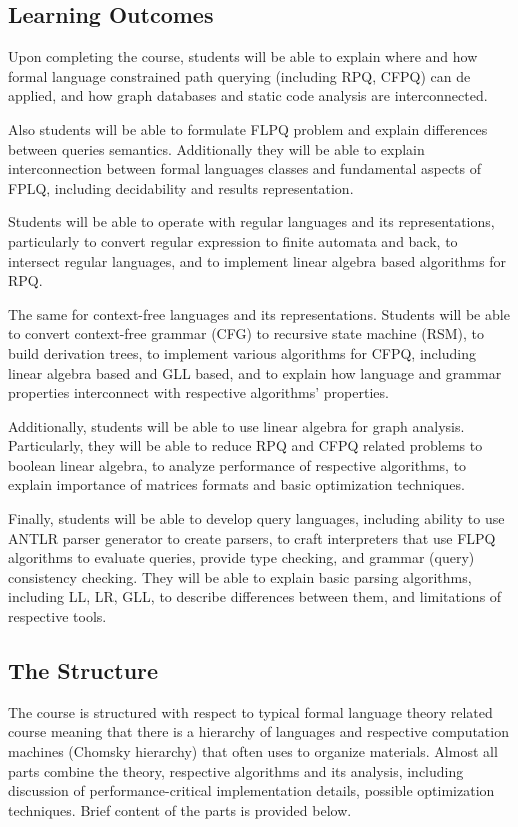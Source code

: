\documentclass[sigconf]{acmart}
\begin{document}
\subsection{Learning Outcomes}

Upon completing the course, students will be able to explain where and how formal language constrained path querying (including RPQ, CFPQ) can de applied, and how graph databases and static code analysis are interconnected.

Also students will be able to formulate FLPQ problem and explain differences between queries semantics.
Additionally they will be able to explain interconnection between formal languages classes and fundamental aspects of FPLQ, including decidability and results representation.

Students will be able to operate with regular languages and its representations, particularly to convert regular expression to finite automata and back, to intersect regular languages, and to implement linear algebra based algorithms for RPQ. 

The same for context-free languages and its representations. 
Students will be able to convert context-free grammar (CFG) to recursive state machine (RSM), to build derivation trees, to implement various algorithms for CFPQ, including linear algebra based and GLL based, and to explain how language and grammar properties interconnect with respective algorithms' properties. 

Additionally, students will be able to use linear algebra for graph analysis. 
Particularly, they will be able to reduce RPQ and CFPQ related problems to boolean linear algebra, to analyze performance of respective algorithms, to explain importance of matrices formats and basic optimization techniques.

Finally, students will be able to develop query languages, including ability to use ANTLR parser generator to create parsers, to craft interpreters that use FLPQ algorithms to evaluate queries, provide type checking, and grammar (query) consistency checking. 
They will be able to explain basic parsing algorithms, including LL, LR, GLL, to describe differences between them, and limitations of respective tools. 


\subsection{The Structure}

The course is structured with respect to typical formal language theory related course meaning that there is a hierarchy of languages and respective computation machines (Chomsky hierarchy) that often uses to organize materials. 
Almost all parts combine the theory, respective algorithms and its analysis, including discussion of performance-critical implementation details, possible optimization techniques. 
Brief content of the parts is provided below.
\end{document}
